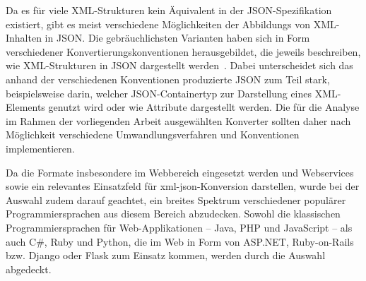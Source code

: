 Da es für viele XML-Strukturen kein Äquivalent in der JSON-Spezifikation existiert, gibt es meist verschiedene Möglichkeiten der Abbildungs von XML-Inhalten in JSON.
Die gebräuchlichsten Varianten haben sich in Form verschiedener Konvertierungskonventionen herausgebildet, die jeweils beschreiben, wie XML-Strukturen in JSON dargestellt werden~\cite{open311-conventions}. Dabei unterscheidet sich das anhand der verschiedenen Konventionen produzierte JSON zum Teil stark, beispielsweise darin, welcher JSON-Container\-typ zur Darstellung eines XML-Elements genutzt wird oder wie Attribute dargestellt werden. Die für die Analyse im Rahmen der vorliegenden Arbeit ausgewählten Konverter sollten daher nach Möglichkeit verschiedene Umwandlungsverfahren und Konventionen implementieren.

Da die Formate insbesondere im Webbereich eingesetzt werden und Webservices sowie  ein relevantes Einsatzfeld für \acrshort{xml}-\acrshort{json}-Konversion darstellen, wurde bei der Auswahl zudem darauf geachtet, ein breites Spektrum verschiedener populärer Programmiersprachen aus diesem Bereich abzudecken. Sowohl die klassischen Programmiersprachen für Web-Applikationen --  Java, PHP und JavaScript -- als auch C\#, Ruby und Python, die im Web in Form von ASP.NET, Ruby-on-Rails bzw. Django oder Flask zum Einsatz kommen, werden durch die Auswahl abgedeckt.

